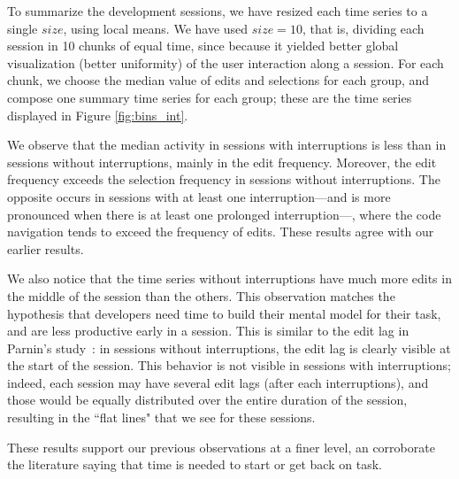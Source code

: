 \documentclass[conference]{IEEEtran}
\begin{document}
To summarize the development sessions, we have resized each time series to a single $size$, using local means. We have used $size = 10$, that is, dividing each session in 10 chunks of equal time, since because it yielded better global visualization (better uniformity) of the user interaction along a session. For each chunk, we choose the median value of edits and selections for each group, and compose one summary time series for each group; these are the time series displayed in Figure \ref{fig:bins_int}.

We observe that the median activity in sessions with interruptions is less than in sessions without interruptions, mainly in the edit frequency. Moreover, the edit frequency exceeds the selection frequency in sessions without interruptions. The opposite occurs in sessions with at least one interruption---and is more pronounced when there is at least one prolonged interruption---, where the code navigation tends to exceed the frequency of edits. These results agree with our earlier results. 

We also notice that the time series without interruptions have much more edits in the middle of the session than the others. This observation matches the hypothesis that developers need time to build their mental model for their task, and are less productive early in a session. This is similar to the edit lag in Parnin's study~\cite{PR11}: in sessions without interruptions, the edit lag is clearly visible at the start of the session. This behavior is not visible in sessions with interruptions; indeed, each session may have several edit lags (after each interruptions), and those would be equally distributed over the entire duration of the session, resulting in the ``flat lines" that we see for these sessions.



These results support our previous observations at a finer level, an corroborate the literature saying that time is needed to start or get back on task.


\end{document}
